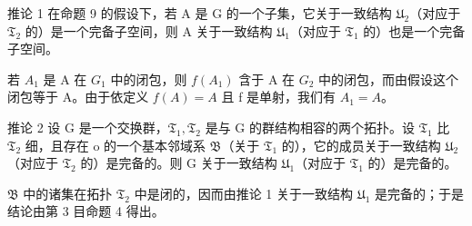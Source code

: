 推论 1 在命题 9 的假设下，若 A 是 G 的一个子集，它关于一致结构 \(\mathfrak{U}_{2}\)（对应于 \(\mathfrak{T}_{2}\) 的）是一个完备子空间，则 A 关于一致结构 \(\mathfrak{U}_{1}\)（对应于 \(\mathfrak{T}_{1}\) 的）也是一个完备子空间。

若 \(A_{1}\) 是 A 在 \(G_{1}\) 中的闭包，则 \(f(A_{1})\) 含于 A 在 \(G_{2}\) 中的闭包，而由假设这个闭包等于 A。由于依定义 \(f(A)=A\) 且 f 是单射，我们有 \(A_{1}=A\)。

推论 2 设 G 是一个交换群，\(\mathfrak{T}_1, \mathfrak{T}_2\) 是与 G 的群结构相容的两个拓扑。设 \(\mathfrak{T}_1\) 比 \(\mathfrak{T}_2\) 细，且存在 o 的一个基本邻域系 \(\mathfrak{B}\)（关于 \(\mathfrak{T}_1\) 的），它的成员关于一致结构 \(\mathfrak{U}_2\)（对应于 \(\mathfrak{T}_2\) 的）是完备的。则 G 关于一致结构 \(\mathfrak{U}_1\)（对应于 \(\mathfrak{T}_1\) 的）是完备的。

\(\mathfrak{B}\) 中的诸集在拓扑 \(\mathfrak{T}_{2}\) 中是闭的，因而由推论 1 关于一致结构 \(\mathfrak{U}_{1}\) 是完备的；于是结论由第 3 目命题 4 得出。

